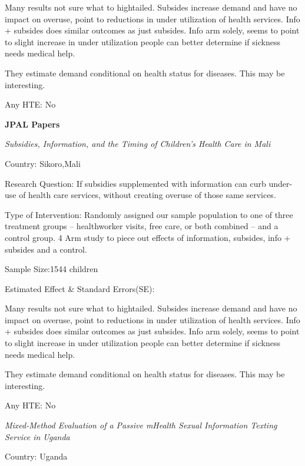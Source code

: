 \documentclass{article}
\begin{document}
Many results not sure what to hightailed.
Subsides increase demand and have no impact on overuse, point to reductions in under utilization of health services.
Info + subsides does similar outcomes as just subsides.
Info arm solely, seems to point to slight increase in under utilization people can better determine if sickness needs medical help.

\hfill


They estimate demand conditional on health status for diseases. This may be interesting.
\hfill

Any HTE: No


\textbf{JPAL Papers}


\textit{Subsidies, Information, and the Timing of Children’s Health Care in Mali
}


\hfill

Country: Sikoro,Mali

\hfill

Research Question:
 If subsidies supplemented with  information can curb under-use of health care services, without creating overuse of those same services.


\hfill

Type of Intervention: Randomly assigned our sample population to one of three treatment groups – healthworker visits, free care, or both combined – and a control group. 4 Arm study to piece out effects of information, subsides, info + subsides and a control.

\hfill

Sample Size:1544 children
\hfill

Estimated Effect \& Standard Errors(SE): 

Many results not sure what to hightailed.
Subsides increase demand and have no impact on overuse, point to reductions in under utilization of health services.
Info + subsides does similar outcomes as just subsides.
Info arm solely, seems to point to slight increase in under utilization people can better determine if sickness needs medical help.

\hfill


They estimate demand conditional on health status for diseases. This may be interesting.
\hfill

Any HTE: No

\textit{Mixed-Method Evaluation of a Passive mHealth Sexual Information Texting Service in Uganda
}


\hfill

Country: Uganda
\end{document}
